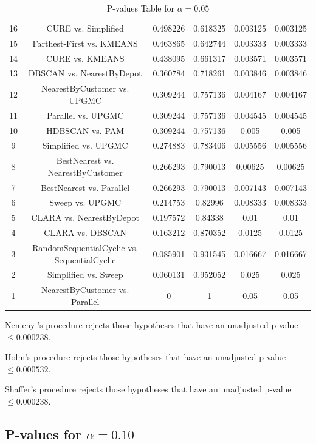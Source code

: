 \documentclass[a4paper,10pt]{article}
\begin{document}
\begin{landscape}
\begin{table}[!htp]
\begin{tabular}{cccccc}
16&CURE vs. Simplified&0.498226&0.618325&0.003125&0.003125\\
15&Farthest-First vs. KMEANS&0.463865&0.642744&0.003333&0.003333\\
14&CURE vs. KMEANS&0.438095&0.661317&0.003571&0.003571\\
13&DBSCAN vs. NearestByDepot&0.360784&0.718261&0.003846&0.003846\\
12&NearestByCustomer vs. UPGMC&0.309244&0.757136&0.004167&0.004167\\
11&Parallel vs. UPGMC&0.309244&0.757136&0.004545&0.004545\\
10&HDBSCAN vs. PAM&0.309244&0.757136&0.005&0.005\\
9&Simplified vs. UPGMC&0.274883&0.783406&0.005556&0.005556\\
8&BestNearest vs. NearestByCustomer&0.266293&0.790013&0.00625&0.00625\\
7&BestNearest vs. Parallel&0.266293&0.790013&0.007143&0.007143\\
6&Sweep vs. UPGMC&0.214753&0.82996&0.008333&0.008333\\
5&CLARA vs. NearestByDepot&0.197572&0.84338&0.01&0.01\\
4&CLARA vs. DBSCAN&0.163212&0.870352&0.0125&0.0125\\
3&RandomSequentialCyclic vs. SequentialCyclic&0.085901&0.931545&0.016667&0.016667\\
2&Simplified vs. Sweep&0.060131&0.952052&0.025&0.025\\
1&NearestByCustomer vs. Parallel&0&1&0.05&0.05\\
\hline
\end{tabular}
\caption{P-values Table for $\alpha=0.05$}
\end{table}Nemenyi's procedure rejects those hypotheses that have an unadjusted p-value $\le0.000238$.

Holm's procedure rejects those hypotheses that have an unadjusted p-value $\le0.000532$.

Shaffer's procedure rejects those hypotheses that have an unadjusted p-value $\le0.000238$.

\pagebreak

\subsection{P-values for $\alpha=0.10$}


\end{landscape}
\end{document}
